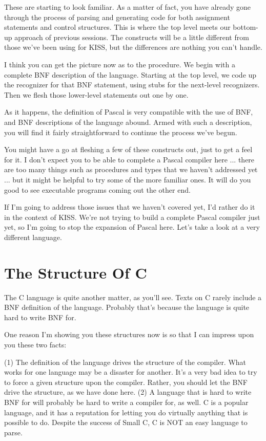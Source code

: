 These  are  starting  to look familiar. As a matter of fact, you have already gone  through  the process of parsing and generating code for both assignment statements and control structures. This is where the top level meets our bottom-up  approach  of previous sessions. The constructs will be a little  different  from those we've  been  using  for KISS, but the differences are nothing you can't handle.

I  think  you can get the picture now as to the  procedure. We begin with a complete BNF  description of the language. Starting at  the  top  level, we code  up  the  recognizer  for  that  BNF statement, using stubs  for  the next-level recognizers. Then we flesh those lower-level statements out one by one.

As it happens, the definition of Pascal is  very  compatible with the  use of BNF, and BNF descriptions  of  the  language  abound. Armed  with  such   a   description, you  will  find  it  fairly straightforward to continue the process we've begun.

You  might  have  a go at fleshing a few of these constructs out, just  to get a feel for it. I don't expect you  to  be  able  to complete a Pascal compiler  here  ... there  are too many things such  as  procedures  and types that we haven't addressed yet ... but  it  might  be helpful to try some of the more familiar ones. It will do  you  good  to  see executable programs coming out the other end.

If I'm going to address those issues that we haven't covered yet, I'd rather  do  it  in  the context of KISS. We're not trying to build a complete Pascal  compiler  just yet, so I'm going to stop the expansion of Pascal here. Let's  take  a  look  at  a very different language.

\section{The Structure Of C}

The C language is quite another matter, as you'll see. Texts on C  rarely  include  a BNF definition of  the  language. Probably that's because the language is quite hard to write BNF for.

One reason I'm showing you these structures now is so that  I can impress upon you these two facts:

(1)	The definition of  the  language drives the structure of the compiler. What works for one language may be a disaster for another. It's  a very bad idea to try to  force  a  given structure upon the compiler. Rather, you should let the BNF drive the structure, as we have done here.
(2)	A language that is hard to write BNF for  will  probably  be hard  to  write  a compiler for, as well. C  is  a  popular language, and  it  has  a  reputation  for  letting you  do virtually  anything that is possible to  do. Despite  the success of Small C, C is  NOT  an easy language to parse.

